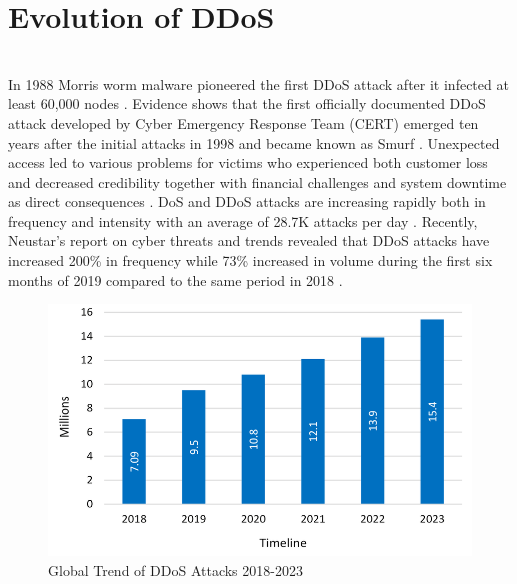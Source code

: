 \section{Evolution of DDoS}
\\In 1988 Morris worm malware pioneered the first DDoS attack after it infected at least 60,000 nodes \cite{fazio2020packet}. Evidence shows that the first officially documented DDoS attack developed by Cyber Emergency Response Team (CERT) emerged ten years after the initial attacks in 1998 and became known as Smurf \cite{abubakar2020effective,goswami2021probability}. Unexpected access led to various problems for victims who experienced both customer loss and decreased credibility together with financial challenges and system downtime as direct consequences \cite{sundarapandian2009probability}. DoS and DDoS attacks are increasing rapidly both in frequency and intensity with an average of 28.7K attacks per day \cite{MANSFIELDDEVINE201513,MANSFIELDDEVINE201514}. Recently, Neustar's report on cyber threats and trends \cite{jonker2017millions} revealed that DDoS attacks have increased 200\% in frequency while 73\% increased in volume during the first six months of 2019 compared to the same period in 2018 \cite{threatstrends}.
\\
\begin{figure}[!htb]
    \centering
    \includegraphics[width=0.8\linewidth]{thesis/timeline.png}
    \caption{ Global Trend of DDoS Attacks 2018-2023}
    \label{fig:enter-label}
\end{figure}
\newpage
